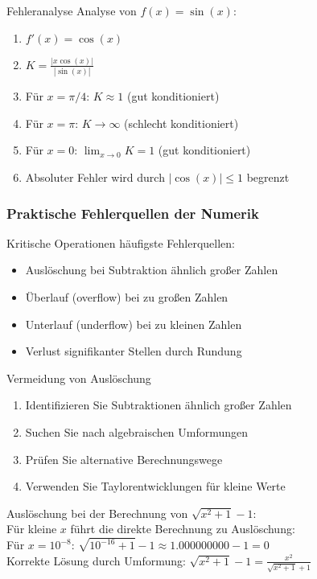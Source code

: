 \begin{example2}{Fehleranalyse} Analyse von $f(x)=\sin(x)$:
\begin{enumerate}
    \item $f'(x) = \cos(x)$
    \item $K = \frac{|x\cos(x)|}{|\sin(x)|}$
    \item Für $x = \pi/4$: $K \approx 1$ (gut konditioniert)
    \item Für $x = \pi$: $K \to \infty$ (schlecht konditioniert)
    \item Für $x = 0$: $\lim_{x \to 0} K = 1$ (gut konditioniert)
    \item Absoluter Fehler wird durch $|\cos(x)| \leq 1$ begrenzt
\end{enumerate}
\end{example2}

\subsubsection{Praktische Fehlerquellen der Numerik}

\begin{concept}{Kritische Operationen} häufigste Fehlerquellen:
\begin{itemize}
    \item Auslöschung bei Subtraktion ähnlich großer Zahlen
    \item Überlauf (overflow) bei zu großen Zahlen
    \item Unterlauf (underflow) bei zu kleinen Zahlen
    \item Verlust signifikanter Stellen durch Rundung
\end{itemize}
\end{concept}



\begin{KR}{Vermeidung von Auslöschung}
\begin{enumerate}
    \item Identifizieren Sie Subtraktionen ähnlich großer Zahlen
    \item Suchen Sie nach algebraischen Umformungen
    \item Prüfen Sie alternative Berechnungswege
    \item Verwenden Sie Taylorentwicklungen für kleine Werte
\end{enumerate}
\end{KR}

\begin{example2}{Auslöschung} bei der Berechnung von $\sqrt{x^2 + 1} - 1$:
    \vspace{1mm}\\
    Für kleine $x$ führt die direkte Berechnung zu Auslöschung:
    \vspace{1mm}\\
    Für $x = 10^{-8}$: $\sqrt{10^{-16} + 1} - 1 \approx 1.000000000 - 1 = 0$
    \vspace{1mm}\\
    Korrekte Lösung durch Umformung: $\sqrt{x^2 + 1} - 1 = \frac{x^2}{\sqrt{x^2 + 1} + 1}$
\end{example2}

